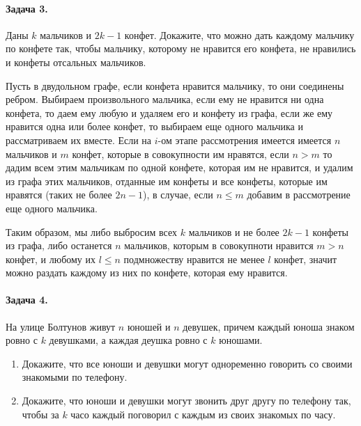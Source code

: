 \documentclass[a4paper,12pt]{article}
\begin{document}
\paragraph{Задача 3.} Даны $k$ мальчиков и $2k-1$ конфет. Докажите, что можно дать каждому мальчику по конфете так, чтобы мальчику, которому не нравится его конфета, не нравились и конфеты отсальных мальчиков.
\begin{Proof}
Пусть в двудольном графе, если конфета нравится мальчику, то они соединены ребром. Выбираем произвольного мальчика, если ему не нравится ни одна конфета, то даем ему любую и удаляем его и конфету из графа, если же ему нравится одна или более конфет, то выбираем еще одного мальчика и рассматриваем их вместе. Если на $i$-ом этапе рассмотрения имеется имеется $n$ мальчиков и $m$ конфет, которые в совокупности им нравятся, если $n>m$ то дадим всем этим мальчикам по одной конфете, которая им не нравится, и удалим из графа этих мальчиков, отданные им конфеты и все конфеты, которые им нравятся (таких не более $2n-1$), в случае, если $n \le m$ добавим в рассмотрение еще одного мальчика.

Таким образом, мы либо выбросим всех $k$ мальчиков и не более $2k-1$ конфеты из графа, либо останется $n$ мальчиков, которым в совокупноти нравится $m>n$ конфет, и любому их $l\le n$ подмножеству нравится не менее $l$ конфет, значит можно раздать каждому из них по конфете, которая ему нравится. 
\end{Proof}

\paragraph{Задача 4.} На улице Болтунов живут $n$ юношей и $n$ девушек, причем каждый юноша знаком ровно с $k$ девушками, а каждая деушка ровно с $k$ юношами.
\begin{enumerate}
\item Докажите, что все юноши и девушки могут одноременно говорить со своими знакомыми по телефону.

\item Докажите, что юноши и девушки могут звонить друг другу по телефону так, чтобы за $k$ часо каждый поговорил с каждым из своих знакомых по часу.
\end{enumerate}
\end{document}
